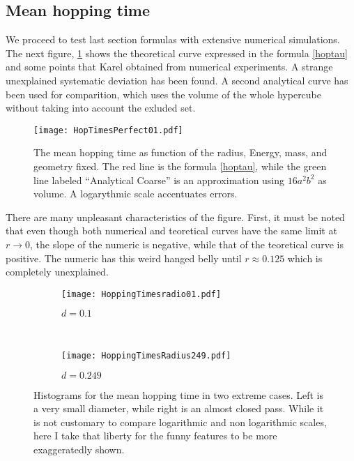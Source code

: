 \documentclass[a4paper,10pt, jcp, aps, preprint]{revtex4-1}
\begin{document}
\subsection{Mean hopping time}

We proceed to test last section formulas with
extensive numerical simulations.
The next figure, \ref{MeanHopp01} shows the theoretical curve 
expressed in the formula \ref{hoptau} and some points
that Karel obtained from numerical experiments. A strange unexplained
systematic
deviation has been found. A second analytical curve
has been used for comparition, which uses the volume of the
whole hypercube without taking into account the exluded
set. 

\begin{figure}[h]
  \centering
  \texttt{[image: HopTimesPerfect01.pdf]}
  \caption{The mean hopping time as function of the radius, Energy, mass, 
and geometry fixed.
The red line is the formula \ref{hoptau}, while the green line
labeled ``Analytical Coarse'' is an approximation using
 $16a^2b^2$ as volume. A logarythmic scale accentuates errors.}\label{MeanHopp01}
\end{figure}

There are many unpleasant characteristics of the figure. First, it must be
noted that even though both numerical and teoretical curves have the
same limit at $r\rightarrow 0$, the slope of the numeric is negative, while 
that of the teoretical curve is positive. The numeric has this weird 
hanged belly until $r\approx 0.125$ which is completely unexplained.

\begin{figure}[h]
        \centering
        \begin{subfigure}[b]{0.45\textwidth}
                \centering
                \texttt{[image: HoppingTimesradio01.pdf]}
                \caption{$d=0.1$}
                \label{smallradius}
        \end{subfigure}%
        ~ %
        \begin{subfigure}[b]{0.45\textwidth}
                \centering
                \texttt{[image: HoppingTimesRadius249.pdf]}
                \caption{$d=0.249$}
                \label{bigradius}
        \end{subfigure}       
        \caption{Histograms for the mean hopping time
in two extreme cases. Left is a very small diameter, while right is an almost
closed pass. While it is not customary to compare logarithmic and non
logarithmic scales, here I take that liberty for the funny features to be
more exaggeratedly shown.}\label{histohopps}
\end{figure}
\end{document}
